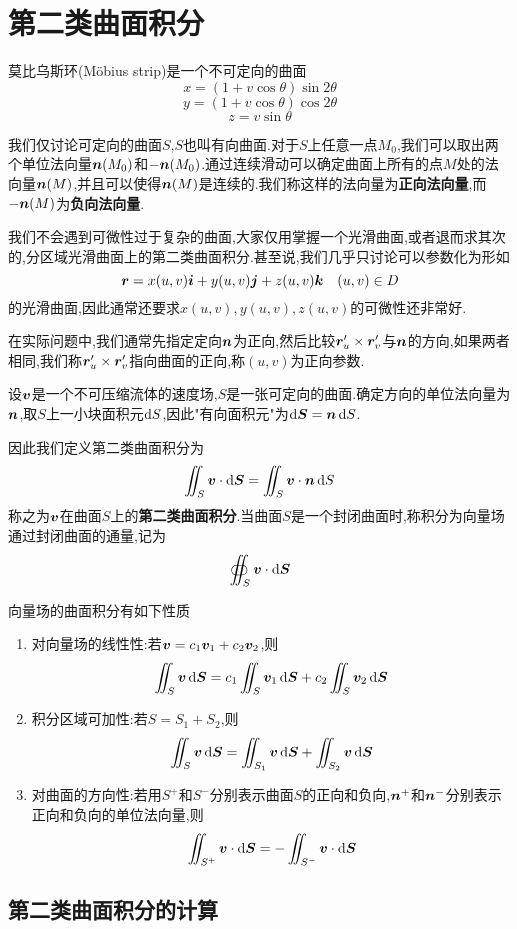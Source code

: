 \setcounter{chapter}{29} %

\chapter{第二类曲面积分}

莫比乌斯环(Möbius strip)是一个不可定向的曲面
$$x = (1+v \cos \theta) \sin 2\theta$$
$$y = (1+v \cos \theta) \cos 2\theta$$
$$z = v \sin \theta$$

我们仅讨论可定向的曲面$S$,$S$也叫有向曲面.对于$S$上任意一点$M_0$,我们可以取出两个单位法向量$\bm{n}(M_0)$和$-\bm{n}(M_0)$.通过连续滑动可以确定曲面上所有的点$M$处的法向量$\bm{n}(M)$,并且可以使得$\bm{n}(M)$是连续的.我们称这样的法向量为\textbf{正向法向量},而$-\bm{n}(M)$为\textbf{负向法向量}.

我们不会遇到可微性过于复杂的曲面,大家仅用掌握一个光滑曲面,或者退而求其次的,分区域光滑曲面上的第二类曲面积分.甚至说,我们几乎只讨论可以参数化为形如
$$\bm{r} = x(u,v) \bm{i} + y(u,v) \bm{j} + z(u,v) \bm{k} \quad (u,v) \in D$$
的光滑曲面,因此通常还要求$x(u,v),y(u,v),z(u,v)$的可微性还非常好.

在实际问题中,我们通常先指定定向$\bm{n}$为正向,然后比较$\bm{r}_u' \times \bm{r}_v'$与$\bm{n}$的方向,如果两者相同,我们称$\bm{r}_u' \times \bm{r}_v'$指向曲面的正向,称$(u,v)$为正向参数.

设$\bm{v}$是一个不可压缩流体的速度场,$S$是一张可定向的曲面.确定方向的单位法向量为$\bm{n}$,取$S$上一小块面积元$\operatorname{d\!} S$,因此"有向面积元"为$\operatorname{d\!} \bm{S} = \bm{n} \operatorname{d\!} S$.

因此我们定义第二类曲面积分为
$$\iint_S \bm{v} \cdot \operatorname{d\!} \bm{S} = \iint_S \bm{v} \cdot \bm{n} \operatorname{d\!} S$$
称之为$\bm{v}$在曲面$S$上的\textbf{第二类曲面积分}.当曲面$S$是一个封闭曲面时,称积分为向量场通过封闭曲面的通量,记为
$$\oiint_S \bm{v} \cdot \operatorname{d\!} \bm{S}$$

向量场的曲面积分有如下性质
\begin{enumerate}
    \item 对向量场的线性性:若$\bm{v} = c_1 \bm{v}_1 + c_2 \bm{v}_2$,则
    $$\iint_S \bm{v} \operatorname{d\!} \bm{S} = c_1 \iint_S \bm{v}_1 \operatorname{d\!} \bm{S} + c_2 \iint_S \bm{v}_2 \operatorname{d\!} \bm{S}$$
    \item 积分区域可加性:若$S = S_1 + S_2$,则
    $$\iint_S \bm{v} \operatorname{d\!} \bm{S} = \iint_{S_1} \bm{v} \operatorname{d\!} \bm{S} + \iint_{S_2} \bm{v} \operatorname{d\!} \bm{S}$$
    \item 对曲面的方向性:若用$S^+$和$S^-$分别表示曲面$S$的正向和负向,$\bm{n}^+$和$\bm{n}^-$分别表示正向和负向的单位法向量,则
    $$\iint_{S^+} \bm{v} \cdot \operatorname{d\!} \bm{S} = -\iint_{S^-} \bm{v} \cdot \operatorname{d\!} \bm{S}$$
\end{enumerate}

\section{第二类曲面积分的计算}

